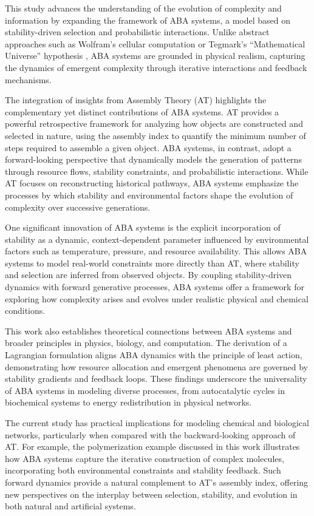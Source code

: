 \documentclass[entropy,article,submit,pdftex,oneauthor]{Definitions/mdpi}
\begin{document}
This study advances the understanding of the evolution of complexity and information by expanding the framework of ABA systems, a model based on stability-driven selection and probabilistic interactions. Unlike abstract approaches such as Wolfram’s cellular computation \cite{wolfram2020fundamental} or Tegmark’s “Mathematical Universe” hypothesis \cite{tegmark2008mathematical}, ABA systems are grounded in physical realism, capturing the dynamics of emergent complexity through iterative interactions and feedback mechanisms.

The integration of insights from Assembly Theory (AT) \cite{walker2023nature} highlights the complementary yet distinct contributions of ABA systems. AT provides a powerful retrospective framework for analyzing how objects are constructed and selected in nature, using the assembly index to quantify the minimum number of steps required to assemble a given object. ABA systems, in contrast, adopt a forward-looking perspective that dynamically models the generation of patterns through resource flows, stability constraints, and probabilistic interactions. While AT focuses on reconstructing historical pathways, ABA systems emphasize the processes by which stability and environmental factors shape the evolution of complexity over successive generations. 

One significant innovation of ABA systems is the explicit incorporation of stability as a dynamic, context-dependent parameter influenced by environmental factors such as temperature, pressure, and resource availability. This allows ABA systems to model real-world constraints more directly than AT, where stability and selection are inferred from observed objects. By coupling stability-driven dynamics with forward generative processes, ABA systems offer a framework for exploring how complexity arises and evolves under realistic physical and chemical conditions.

This work also establishes theoretical connections between ABA systems and broader principles in physics, biology, and computation. The derivation of a Lagrangian formulation aligns ABA dynamics with the principle of least action, demonstrating how resource allocation and emergent phenomena are governed by stability gradients and feedback loops. These findings underscore the universality of ABA systems in modeling diverse processes, from autocatalytic cycles in biochemical systems to energy redistribution in physical networks.

The current study has practical implications for modeling chemical and biological networks, particularly when compared with the backward-looking approach of AT. For example, the polymerization example discussed in this work illustrates how ABA systems capture the iterative construction of complex molecules, incorporating both environmental constraints and stability feedback. Such forward dynamics provide a natural complement to AT’s assembly index, offering new perspectives on the interplay between selection, stability, and evolution in both natural and artificial systems.
\end{document}
